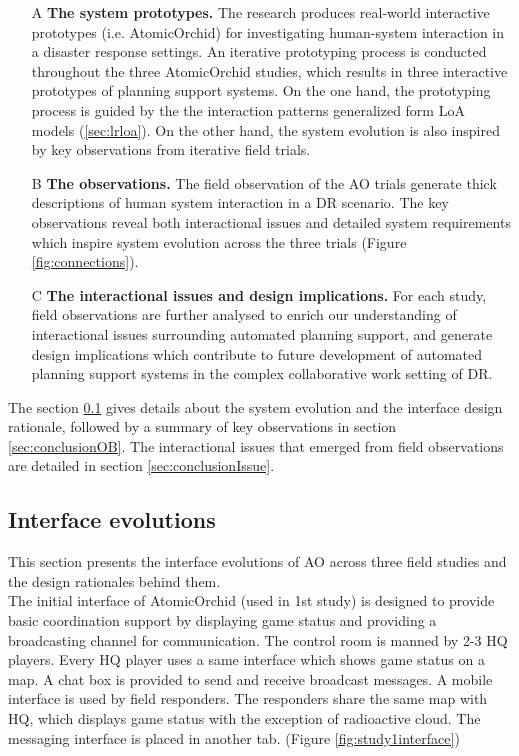 \begin{enumerate}
  \item[A] \textbf{The system prototypes.} The research produces real-world interactive prototypes (i.e. AtomicOrchid) for investigating human-system interaction in a disaster response settings. An iterative prototyping process is conducted throughout the three AtomicOrchid studies, which results in three interactive prototypes of planning support systems. On the one hand, the prototyping process is guided by the the interaction patterns generalized form \ac{LoA} models (\ref{sec:lrloa}). On the other hand, the system evolution is also inspired by key observations from iterative field trials. 
  
  \item[B] \textbf{The observations.} The field observation of the \ac{AO} trials generate thick descriptions of human system interaction in a \ac{DR} scenario. The key observations reveal both interactional issues and detailed system requirements which inspire system evolution across the three trials (Figure \ref{fig:connections}).
  
  \item[C] \textbf{The interactional issues and design implications.} For each study, field observations are further analysed to enrich our understanding of interactional issues surrounding automated planning support, and generate design implications which contribute to future development of automated planning support systems in the complex collaborative work setting of \ac{DR}. 
\end{enumerate}

The section \ref{sec:conclusionIE} gives details about the system evolution and the interface design rationale, followed by a summary of key observations in section \ref{sec:conclusionOB}. The interactional issues that emerged from field observations are detailed in section \ref{sec:conclusionIssue}. \\



\subsection{Interface evolutions}\label{sec:conclusionIE}
This section presents the interface evolutions of \acf{AO} across three field studies and the design rationales behind them.\\

The initial interface of AtomicOrchid (used in 1st study) is designed to provide basic coordination support by displaying game status and providing a broadcasting channel for communication. The control room is manned by 2-3 HQ players. Every HQ player uses a same interface which shows game status on a map. A chat box is provided to send and receive broadcast messages. A mobile interface is used by field responders. The responders share the same map with HQ, which displays game status with the exception of radioactive cloud. The messaging interface is placed in another tab. (Figure \ref{fig:study1interface})\\ 

